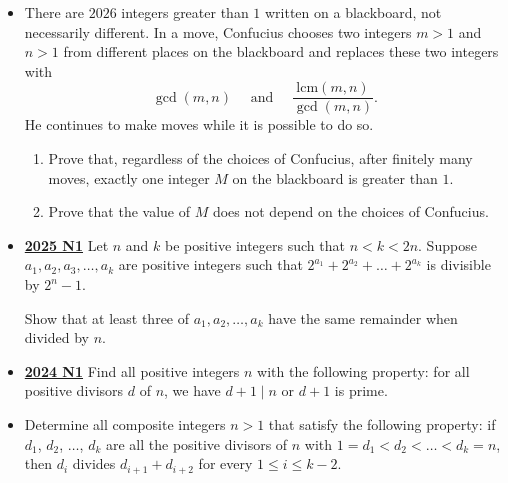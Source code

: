 \documentclass[11pt]{scrartcl}
\begin{document}
\begin{itemize}[leftmargin=*]

\item {} There are $2026$ integers greater than $1$ written on a blackboard, not necessarily different. In a move, Confucius chooses two integers $m>1$ and $n>1$ from different places on the blackboard and replaces these two integers with
\[\gcd(m,n) \quad \text{ and } \quad  \frac{\mathrm{lcm}(m,n)}{\gcd(m,n)}.\]
He continues to make moves while it is possible to do so.
\begin{enumerate}[leftmargin=*]
\item[(a)] Prove that, regardless of the choices of Confucius, after finitely many moves, exactly one integer $M$ on the blackboard is greater than $1$.

\item[(b)] Prove that the value of $M$ does not depend on the choices of Confucius.
\end{enumerate}

\item \href{https://artofproblemsolving.com/community/c6h3866859p38676947}{\textbf{2025 N1}} Let $n$ and $k$ be positive integers such that $n<k<2n$. Suppose $a_1, a_2, a_3,\dots, a_k$ are positive integers such that   $2^{a_1}+2^{a_2}+\dots+2^{a_k}$ 
    is divisible by $2^n-1$. 
    
    Show that at least three of $a_1,a_2,\ldots, a_k$ have the same remainder when divided by $n$.


\item \href{https://artofproblemsolving.com/community/c6h3610447p35340920}{\textbf{2024 N1}} Find all positive integers $n$ with the following property: for all positive divisors $d$ of $n$, we have $d+1\mid n$ or $d+1$ is prime.	

\item {} Determine all composite integers $n>1$ that satisfy the following property: if $d_1$, $d_2$, $\dots$, $d_k$ are all the positive divisors of $n$ with $1 = d_1 < d_2 < \dots < d_k = n$, then $d_i$ divides $d_{i+1} + d_{i+2}$ for every $1 \leqslant i \leqslant k - 2$.	


\end{itemize}
\end{document}
